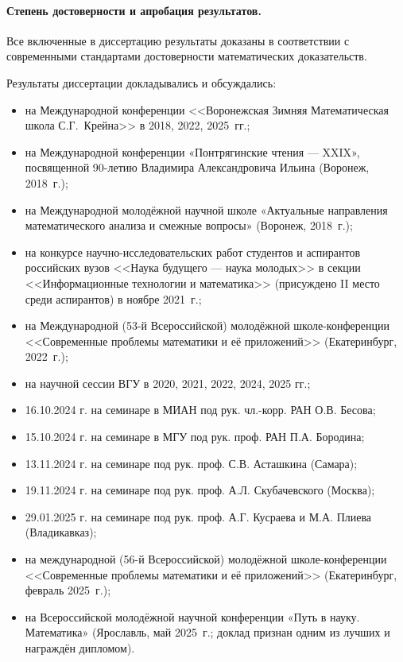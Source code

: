 \paragraph{Степень достоверности и апробация результатов.}

Все включенные в диссертацию результаты доказаны
в соответствии с современными стандартами достоверности математических доказательств.

Результаты диссертации докладывались и обсуждались:
\begin{itemize}
	\item
		на Международной конференции <<Воронежская Зимняя Математическая школа С.Г.~Крейна>> в 2018, 2022, 2025~гг.;
	\item
		на Международной конференции «Понтрягинские чтения — XXIX», посвященной 90-летию Владимира Александровича Ильина (Воронеж, 2018~г.);
	\item
		на Международной молодёжной научной школе «Актуальные направления математического анализа и смежные вопросы» (Воронеж, 2018~г.);
	\item
		на конкурсе научно-исследовательских работ студентов и аспирантов российских вузов
		<<Наука будущего --- наука молодых>> в секции <<Информационные технологии и математика>>
		(присуждено II место среди аспирантов) в ноябре 2021~г.;
	\item
		на Международной (53-й Всероссийской) молодёжной школе-конференции
		<<Современные проблемы математики и её приложений>>
		(Екатеринбург, 2022~г.);
	\item
		на научной сессии ВГУ в 2020, 2021, 2022, 2024, 2025 гг.; %
	\item
		16.10.2024 г. на семинаре в МИАН под рук. чл.-корр. РАН О.В. Бесова;
	\item
		15.10.2024 г. на семинаре в МГУ под рук. проф. РАН П.А. Бородина;
	\item
		13.11.2024 г. на семинаре под рук. проф. С.В. Асташкина (Самара);
	\item
		19.11.2024 г. на семинаре под рук. проф. А.Л. Скубачевского (Москва);
	\item
		29.01.2025 г. на семинаре под рук. проф. А.Г. Кусраева и М.А. Плиева (Владикавказ);
	\item
		на международной (56-й Всероссийской) молодёжной школе-конференции
		<<Современные проблемы математики и её приложений>>
		(Екатеринбург, февраль 2025~г.);
	\item
		на Всероссийской молодёжной научной конференции «Путь в науку. Математика»
		(Ярославль, май 2025~г.; доклад признан одним из лучших и награждён дипломом).
\end{itemize}

